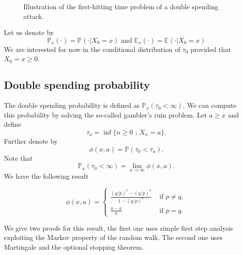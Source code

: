 \begin{figure}[ht!]
\begin{center}
\begin{tikzpicture}
\end{tikzpicture}
\end{center}
\caption{Illustration of the first-hitting time problem of a double spending attack.}
\label{fig:double_spending_time}
\end{figure}
Let us denote by 
$$
\mathbb{P}_x(\cdot) = \mathbb{P}(\cdot|X_0 = x)\text{ and }\mathbb{E}_x(\cdot) = \mathbb{E}(\cdot|X_0 = x) 
$$
We are interested for now in the conditional distribution of ${\tau_0}$ provided that $X_0 = x\geq 0$.
\subsection{Double spending probability}\label{ssec:double_spending_rw_dsp}
The double spending probability is defined as $\mathbb{P}_x({\tau_0} <\infty)$. We can compute this probability by solving the so-called gambler's ruin problem. Let $a\geq x$ and define 
$$
\tau_a = \inf\{n\geq 0\text{ ; }X_n = a\}.
$$
Further denote by 
$$
\phi(x,a) = \mathbb{P}(\tau_0 <\tau_a).
$$
Note that 
$$
\mathbb{P}_x({\tau_0} <\infty) = \underset{a\rightarrow \infty}{\lim} \phi(x,a).
$$
We have the following result
\begin{theo}
\begin{equation}\label{eq:gambler_ruin}
\phi(x,a) = \begin{cases}
\frac{(q/p)^x-(q/p)^a}{1 - (q/p)^a}&\text{ if }p\neq q,\\
\frac{a-x}{a}&\text{ if }p= q.
\end{cases}
\end{equation}
\end{theo}
\noindent We give two proofs for this result, the first one uses simple first step analysis exploiting the Markov property of the random walk. The second one uses Martingale and the optional stopping theorem.\\

